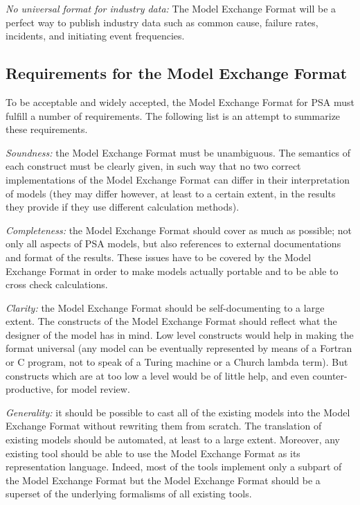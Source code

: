 \documentclass[11pt]{article}
\begin{document}
\emph{No universal format for industry data:} The Model Exchange Format will
be a perfect way to publish industry data such as common cause, failure
rates, incidents, and initiating event frequencies.

\subsection{Requirements for the Model Exchange Format}
\label{sec:org0d3362d}

To be acceptable and widely accepted, the Model Exchange Format for PSA
must fulfill a number of requirements. The following list is an attempt
to summarize these requirements.

\emph{Soundness:} the Model Exchange Format must be unambiguous. The
semantics of each construct must be clearly given, in such way that no
two correct implementations of the Model Exchange Format can differ in
their interpretation of models (they may differ however, at least to a
certain extent, in the results they provide if they use different
calculation methods).

\emph{Completeness:} the Model Exchange Format should cover as much as
possible; not only all aspects of PSA models, but also references to
external documentations and format of the results. These issues have to
be covered by the Model Exchange Format in order to make models actually
portable and to be able to cross check calculations.

\emph{Clarity:} the Model Exchange Format should be self-documenting to a
large extent. The constructs of the Model Exchange Format should reflect
what the designer of the model has in mind. Low level constructs would
help in making the format universal (any model can be eventually
represented by means of a Fortran or C program, not to speak of a Turing
machine or a Church lambda term). But constructs which are at too low a
level would be of little help, and even counter-productive, for model
review.

\emph{Generality:} it should be possible to cast all of the existing models
into the Model Exchange Format without rewriting them from scratch. The
translation of existing models should be automated, at least to a large
extent. Moreover, any existing tool should be able to use the Model
Exchange Format as its representation language. Indeed, most of the
tools implement only a subpart of the Model Exchange Format but the
Model Exchange Format should be a superset of the underlying formalisms
of all existing tools.
\end{document}
